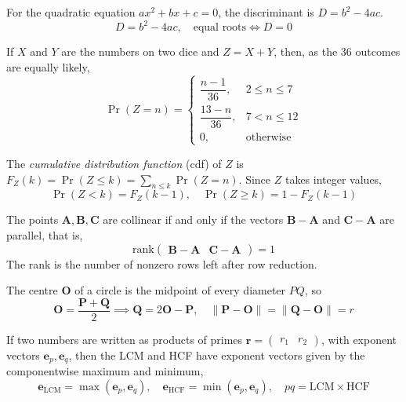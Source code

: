 \item For the quadratic equation $ax^2 + bx + c = 0$, the discriminant is $D = b^2 - 4ac$. 
\begin{equation}
D = b^2 - 4ac, \quad \text{equal roots} \iff D = 0
\label{c10eq:disc}
\end{equation}

\item If $X$ and $Y$ are the numbers on two dice and $Z = X + Y$, then, as the 36 outcomes are equally likely,
\begin{equation}
\Pr(Z = n) = \begin{cases} \dfrac{n-1}{36}, & 2 \le n \le 7 \\[2mm] \dfrac{13-n}{36}, & 7 < n \le 12 \\[2mm] 0, & \text{otherwise} \end{cases}
\label{c10eq:pmfZ}
\end{equation}

\item The \emph{cumulative distribution function} (cdf) of $Z$ is $F_Z(k) = \Pr(Z \le k) = \sum_{n \le k}\Pr(Z = n)$. Since $Z$ takes integer values,
\begin{equation}
\Pr(Z < k) = F_Z(k-1), \quad \Pr(Z \ge k) = 1 - F_Z(k-1)
\label{c10eq:cdf}
\end{equation}

\item The points $\mathbf{A}, \mathbf{B}, \mathbf{C}$ are collinear if and only if the vectors $\mathbf{B}-\mathbf{A}$ and $\mathbf{C}-\mathbf{A}$ are parallel, that is,
\begin{equation}
\text{rank}\begin{pmatrix} \mathbf{B}-\mathbf{A} & \mathbf{C}-\mathbf{A} \end{pmatrix} = 1
\label{c10eq:rank}
\end{equation}
The rank is the number of nonzero rows left after row reduction.

\item The centre $\mathbf{O}$ of a circle is the midpoint of every diameter $PQ$, so
\begin{equation}
\mathbf{O} = \frac{\mathbf{P} + \mathbf{Q}}{2} \implies \mathbf{Q} = 2\mathbf{O} - \mathbf{P}, \quad
\|\mathbf{P} - \mathbf{O}\| = \|\mathbf{Q} - \mathbf{O}\| = r
\label{c10eq:diam}
\end{equation}

\item If two numbers are written as products of primes $\mathbf{r} = \begin{pmatrix} r_1 & r_2 \end{pmatrix}$, with exponent vectors $\mathbf{e}_p, \mathbf{e}_q$, then the LCM and HCF have exponent vectors given by the componentwise maximum and minimum,
\begin{equation}
\mathbf{e}_{\text{LCM}} = \max\left(\mathbf{e}_p, \mathbf{e}_q\right), \quad
\mathbf{e}_{\text{HCF}} = \min\left(\mathbf{e}_p, \mathbf{e}_q\right), \quad
pq = \text{LCM}\times\text{HCF}
\label{c10eq:lcm}
\end{equation}

